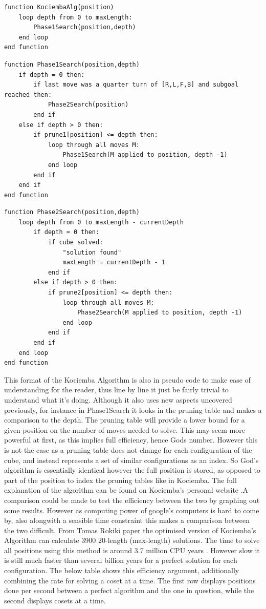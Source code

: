 \documentclass{article}
\begin{document}
\begin{lstlisting}
function KociembaAlg(position)
	loop depth from 0 to maxLength:
		Phase1Search(position,depth)
	end loop
end function
\end{lstlisting}
\begin{lstlisting}
function Phase1Search(position,depth)
	if depth = 0 then:
		if last move was a quarter turn of [R,L,F,B] and subgoal reached then:
			Phase2Search(position)
		end if
	else if depth > 0 then:
		if prune1[position] <= depth then:
			loop through all moves M:
				Phase1Search(M applied to position, depth -1)
			end loop
		end if
	end if
end function
\end{lstlisting}
\begin{lstlisting}
function Phase2Search(position,depth)
	loop depth from 0 to maxLength - currentDepth
		if depth = 0 then:
			if cube solved:
				"solution found"
				maxLength = currentDepth - 1
			end if
		else if depth > 0 then:
			if prune2[position] <= depth then:
				loop through all moves M:
					Phase2Search(M applied to position, depth -1)
				end loop
			end if
		end if
	end loop
end function
\end{lstlisting}
This format of the Kociemba Algorithm is also in pseudo code to make ease of understanding for the reader, thus line by line it just be fairly trivial to understand what it's doing. Although it also uses new aspects uncovered previously, for instance in Phase1Search it looks in the pruning table and makes a comparison to the depth. The pruning table will provide a lower bound for a given position on the number of moves needed to solve. This may seem more powerful at first, as this implies full efficiency, hence Gods number. However this is not the case as a pruning table does not change for each configuration of the cube, and instead represents a set of similar configurations as an index. So God's algorithm is essentially identical however the full position is stored, as opposed to part of the position to index the pruning tables like in Kociemba. The full explanation of the algorithm can be found on Kociemba's personal website \cite{kocweb}.\newline A comparison could be made to test the efficiency between the two by graphing out some results. However as computing power of google's computers is hard to come by, also alongwith a sensible time constraint this makes a comparison between the two difficult. From Tomas Rokiki paper the optimised version of Kociemba's Algorithm can calculate 3900 20-length (max-length) solutions. The time to solve all positions using this method is around 3.7 million CPU years \cite{Rokicki2013TheDO}. However slow it is still much faster than several billion years for a perfect solution for each configuration. The below table shows this efficiency argument, additionally combining the rate for solving a coset at a time. The first row displays positions done per second between a perfect algorithm and the one in question, while the second displays cosets at a time.
\end{document}
